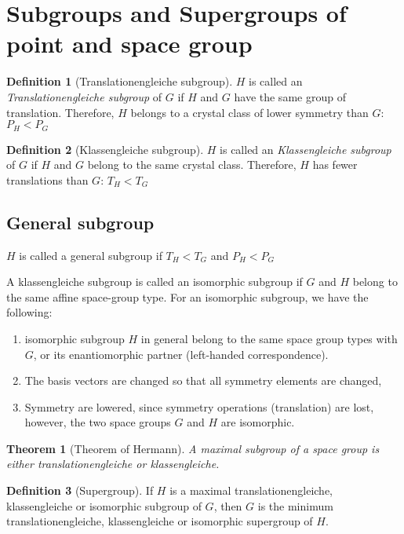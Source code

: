 \documentclass{amsart}
\newtheorem*{theorem}{Theorem}
\theoremstyle{remark}
\theoremstyle{remark}
\theoremstyle{definition}
\newtheorem*{definition}{Definition}
\begin{document}
\vspace{10pt}
\section*{Subgroups and Supergroups of point and space group}
\begin{definition}
    [Translationengleiche subgroup]
    $H$ is called an \emph{Translationengleiche subgroup} of $G$ if $H$ and $G$ have the same group of translation. 
    Therefore, $H$ belongs to a crystal class of lower symmetry than $G$: $P_H < P_G$
\end{definition}

\begin{definition}
    [Klassengleiche subgroup]
    $H$ is called an \emph{Klassengleiche subgroup} of $G$ if $H$ and $G$ belong to the same crystal class. 
    Therefore, $H$ has fewer translations than $G$: $T_H < T_G$
\end{definition}

\subsection*{General subgroup}
$H$ is called a general subgroup if $T_H < T_G$ and $P_H < P_G$

A klassengleiche subgroup is called an isomorphic subgroup if $G$ and $H$ belong to the same affine space-group type. 
For an isomorphic subgroup, we have the following:
\begin{enumerate}
    \item isomorphic subgroup $H$ in general belong to the same space group types with $G$, or its enantiomorphic partner (left-handed correspondence).
    \item The basis vectors are changed so that all symmetry elements are changed,
    \item Symmetry are lowered, since symmetry operations (translation) are lost, however, the two space groups $G$ and $H$ are isomorphic.
\end{enumerate}

\begin{theorem}
    [Theorem of Hermann]
    A maximal subgroup of a space group is either translationengleiche or klassengleiche.
\end{theorem}

\vspace{10pt}

\begin{definition}
    [Supergroup]
    If $H$ is a maximal translationengleiche, klassengleiche or isomorphic subgroup of $G$, then $G$
    is the minimum translationengleiche, klassengleiche or isomorphic supergroup of $H$.
\end{definition}


\newpage
\end{document}
